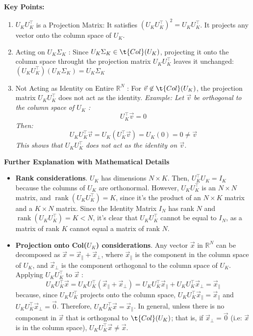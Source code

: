 \documentclass[12pt,article]{memoir}
\begin{document}
{\begin{itemize}
\textbf{Key Points:}
\begin{enumerate}
  \item $U_K U_K^{\top}$ is a Projection Matrix:
It satisfies $\left(U_K U_K^{\top}\right)^2=U_K U_K^{\top}$.
It projects any vector onto the column space of $U_K$.
\item Acting on $U_K \Sigma_K$ :
Since $U_K \Sigma_K\in\t{Col}(U_K)$, projecting it onto the column space throught the projection matrix  $U_K U_K^{\top}$ leaves it unchanged: 
$
(U_K U_K^{\top})(U_K \Sigma_K)=U_K \Sigma_K
$
\item Not Acting as Identity on Entire $\mathbb{R}^N$ :
For $\vec{v}\not\in\t{Col}(U_K)$, the projection matrix $U_K U_K^{\top}$ does not act as the identity. \textit{Example:
Let $\vec{v}$ be orthogonal to the column space of $U_K$ :
$$
U_K^{\top} \vec{v}=0
$$
Then:
$$
U_K U_K^{\top} \vec{v}=U_K\left(U_K^{\top} \vec{v}\right)=U_K(0)=0 \neq \vec{v}
$$
This shows that $U_K U_K^{\top}$ does not act as the identity on $\vec{v}$.
}
\end{enumerate}

\textbf{Further Explanation with Mathematical Details}
\begin{itemize}
  \item \textbf{Rank considerations}. $U_K$ has dimensions $N \times K$. Then, $U_K^{\top} U_K=I_K$ because the columns of $U_K$ are orthonormal. However, $U_K U_K^{\top}$ is an $N \times N$ matrix, and $\operatorname{rank}(U_K U_K^{\top})=K$, since it's the product of an $N \times K$ matrix and a $K \times N$ matrix. Since the Identity Matrix $I_N$ has rank $N$ and $\operatorname{rank}(U_K U_K^{\top})=K<N$, it's clear that $U_K U_K^{\top}$ cannot be equal to $I_N$, as a matrix of rank $K$ cannot equal a matrix of rank $N$.

\item \textbf{Projection onto Col($U_K$) considerations}. Any vector $\vec{x}$ in $\mathbb{R}^N$ can be decomposed as 
$
\vec{x}=\vec{x}_{\|}+\vec{x}_{\perp}
$, where 
$\vec{x}_{\|}$ is the component in the column space of $U_K$, and
$\vec{x}_{\perp}$ is the component orthogonal to the column space of $U_K$.
Applying $U_K U_K^{\top}$ to $\vec{x}$ :
$$
U_K U_K^{\top} \vec{x}
=
U_K U_K^{\top}(\vec{x}_{\|}+\vec{x}_{\perp})
=
U_K U_K^{\top} \vec{x}_{\|}+U_K U_K^{\top} \vec{x}_{\perp} 
=
\vec{x}_{\|} 
$$
because, since $U_K U_K^{\top}$ projects onto the column space, 
$U_K U_K^{\top} \vec{x}_{\|}=\vec{x}_{\|}$ and
$U_K U_K^{\top} \vec{x}_{\perp}=\overrightarrow{0}$.
Therefore,
$
U_K U_K^{\top} \vec{x}=\vec{x}_{\|}
$. In general, unless there is no component in $\vec{x}$ that is orthogonal to $\t{Col}(U_K)$; that is, if $\vec{x}_{\perp}=\overrightarrow{0}$ (i.e: $\vec{x}$ is in the column space), $U_K U_K^{\top} \vec{x} \neq \vec{x}$.
\end{itemize}

\end{itemize}
}
\end{document}
